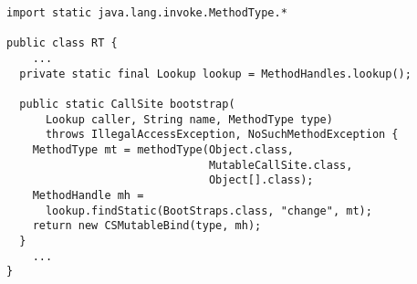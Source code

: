 {\scriptsize \begin{verbatim}
import static java.lang.invoke.MethodType.*

public class RT {
    ...
  private static final Lookup lookup = MethodHandles.lookup();

  public static CallSite bootstrap(
      Lookup caller, String name, MethodType type)
      throws IllegalAccessException, NoSuchMethodException {
    MethodType mt = methodType(Object.class,
                               MutableCallSite.class,
                               Object[].class);
    MethodHandle mh =
      lookup.findStatic(BootStraps.class, "change", mt);
    return new CSMutableBind(type, mh);
  }
    ...
}
\end{verbatim} }
